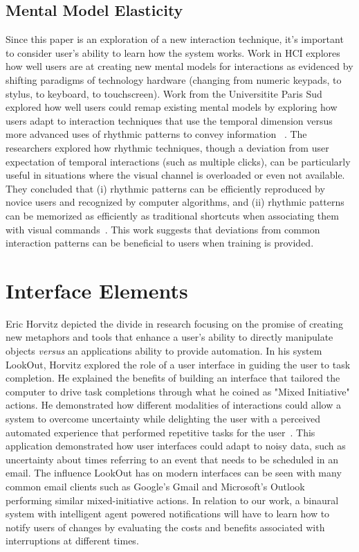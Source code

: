 \subsection{                   Mental Model Elasticity                       }

Since this paper is an exploration of a new interaction technique, it's important to
consider user's ability to learn how the system works. Work in HCI explores how
well users are at creating new mental models for interactions as evidenced by
shifting paradigms of technology hardware (changing from numeric keypads, to
stylus, to keyboard, to touchscreen).  Work from the Universitite Paris Sud
explored how well users could remap existing mental models by exploring how
users adapt to interaction techniques that use the temporal dimension versus
more advanced uses of rhythmic patterns to convey information 
~\cite{ghomi2012using}.  The researchers
explored how rhythmic techniques, though a deviation from  user expectation of
temporal interactions (such as multiple clicks), can be particularly useful in
situations where the visual channel is overloaded or even not available.  They
concluded that  (i) rhythmic patterns can be efficiently reproduced by novice
users and recognized by computer algorithms, and (ii) rhythmic patterns can be
memorized as efficiently as traditional shortcuts when associating them with 
visual commands~\cite{ghomi2012using}.  This work suggests that deviations from
common interaction patterns can be beneficial to users when training is provided.

\section{                  Interface Elements                                }

Eric Horvitz depicted the divide in research focusing on the promise of creating
new metaphors and tools that enhance a user's ability to directly manipulate
objects \textit{versus} an applications ability to provide automation. In his
system LookOut, Horvitz explored the role of a user interface in guiding the
user to task completion.  He explained the benefits of building an interface
that tailored the computer to drive task completions through what he coined as
"Mixed Initiative" actions.  He demonstrated how different modalities of
interactions could allow a system to overcome uncertainty while delighting the
user with a perceived automated experience that performed repetitive tasks for
the user~\cite{horvitz1999principles}.  This application demonstrated how user
interfaces could adapt to noisy data, such as uncertainty about times referring
to an event that needs to be scheduled in an email. The influence LookOut has on
modern interfaces can be seen with many common email clients such as Google's
Gmail and Microsoft's Outlook performing similar mixed-initiative actions.  In
relation to our work, a binaural system with intelligent agent powered notifications
will have to learn how to notify users of changes by evaluating the costs and 
benefits associated with interruptions at different times.

